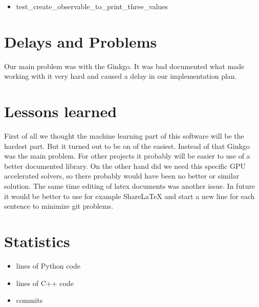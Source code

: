 \documentclass[parskip=full]{scrartcl}
\begin{document}
\begin{itemize}

\item test\_create\_observable\_to\_print\_three\_values

\end{itemize}

\section{Delays and Problems}
Our main problem was with the \gls{Ginkgo}. 
It was bad documented what made working with it very hard and caused a delay in our implementation plan. 


\section{Lessons learned}
First of all we thought the machine learning part of this software will be the hardest part.
But it turned out to be on of the easiest.
Instead of that \gls{Ginkgo} was the main problem.
For other projects it probably will be easier to use of a better documented library.
On the other hand did we need this specific GPU accelerated solvers, so there probably would have been no better or similar solution.
The same time editing of latex documents was another issue.
In future it would be better to use for example ShareLaTeX and start a new line for each sentence to minimize git problems.

\section{Statistics}

\begin{itemize}

\item lines of Python code

\item lines of C++ code

\item commits

\end{itemize}
\end{document}
